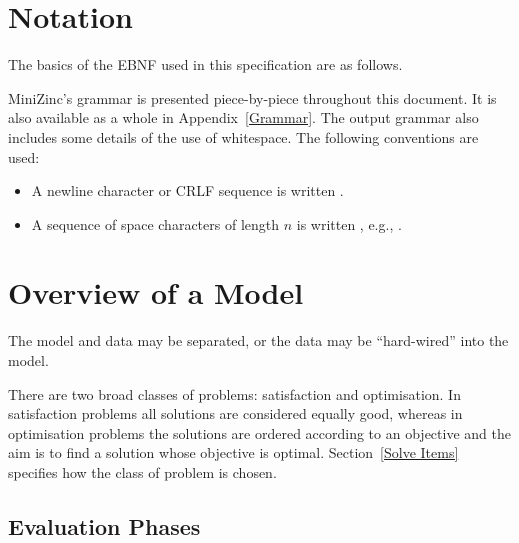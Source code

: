 \documentclass[10pt]{scrartcl}
\begin{document}
\section{Notation}
  \label{Syntax Notation}
The basics of the EBNF used in this specification are as follows.

MiniZinc's grammar is presented piece-by-piece throughout this document.  It is
also available as a whole in Appendix~\ref{Grammar}.
The output grammar also includes some details of the use of whitespace.
The following conventions are used:

\begin{itemize}
\item A newline character or CRLF sequence is written \nl.
\item A sequence of space characters of length $n$ is written ,
e.g., .
\end{itemize}


\section{Overview of a Model}
  \label{Overview}
                         {The model and data may be separated, or the data
                          may be ``hard-wired'' into the model.}

There are two broad classes of problems: satisfaction and optimisation.
In satisfaction problems all solutions are considered equally good,
whereas in optimisation problems the solutions are
ordered according to an objective and
the aim is to find a solution whose objective is optimal.
Section~\ref{Solve Items} specifies how the class of problem is chosen.

\subsection{Evaluation Phases}
\end{document}
